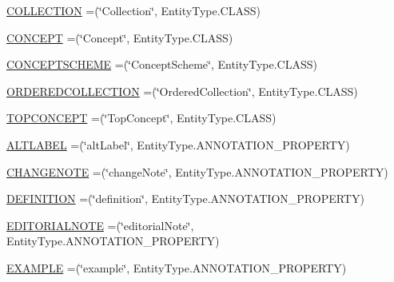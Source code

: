 \begin{DoxyCompactItemize}
\hyperlink{enumorg_1_1semanticweb_1_1owlapi_1_1vocab_1_1_s_k_o_s_vocabulary_abfe5058a98d1c09f7388a36462be1392}{C\-O\-L\-L\-E\-C\-T\-I\-O\-N} =(\char`\"{}Collection\char`\"{}, Entity\-Type.\-C\-L\-A\-S\-S)
\item 
\hyperlink{enumorg_1_1semanticweb_1_1owlapi_1_1vocab_1_1_s_k_o_s_vocabulary_af8de0e17e0cee3a3f769f9d3699b5f27}{C\-O\-N\-C\-E\-P\-T} =(\char`\"{}Concept\char`\"{}, Entity\-Type.\-C\-L\-A\-S\-S)
\item 
\hyperlink{enumorg_1_1semanticweb_1_1owlapi_1_1vocab_1_1_s_k_o_s_vocabulary_aff3ae474a4855b319152fc7c3813a4b4}{C\-O\-N\-C\-E\-P\-T\-S\-C\-H\-E\-M\-E} =(\char`\"{}Concept\-Scheme\char`\"{}, Entity\-Type.\-C\-L\-A\-S\-S)
\item 
\hyperlink{enumorg_1_1semanticweb_1_1owlapi_1_1vocab_1_1_s_k_o_s_vocabulary_aed09239d86300bd7a8c62e9791048c8b}{O\-R\-D\-E\-R\-E\-D\-C\-O\-L\-L\-E\-C\-T\-I\-O\-N} =(\char`\"{}Ordered\-Collection\char`\"{}, Entity\-Type.\-C\-L\-A\-S\-S)
\item 
\hyperlink{enumorg_1_1semanticweb_1_1owlapi_1_1vocab_1_1_s_k_o_s_vocabulary_a86788482a8dc25c754d5b41f17113b71}{T\-O\-P\-C\-O\-N\-C\-E\-P\-T} =(\char`\"{}Top\-Concept\char`\"{}, Entity\-Type.\-C\-L\-A\-S\-S)
\item 
\hyperlink{enumorg_1_1semanticweb_1_1owlapi_1_1vocab_1_1_s_k_o_s_vocabulary_a4b9e80e618910c51b3f5633ce8e1fc8b}{A\-L\-T\-L\-A\-B\-E\-L} =(\char`\"{}alt\-Label\char`\"{}, Entity\-Type.\-A\-N\-N\-O\-T\-A\-T\-I\-O\-N\-\_\-\-P\-R\-O\-P\-E\-R\-T\-Y)
\item 
\hyperlink{enumorg_1_1semanticweb_1_1owlapi_1_1vocab_1_1_s_k_o_s_vocabulary_a554cca7448b38205c243ba8e6a42aef9}{C\-H\-A\-N\-G\-E\-N\-O\-T\-E} =(\char`\"{}change\-Note\char`\"{}, Entity\-Type.\-A\-N\-N\-O\-T\-A\-T\-I\-O\-N\-\_\-\-P\-R\-O\-P\-E\-R\-T\-Y)
\item 
\hyperlink{enumorg_1_1semanticweb_1_1owlapi_1_1vocab_1_1_s_k_o_s_vocabulary_aecf30fba6a050cd6670c364b16d7bd10}{D\-E\-F\-I\-N\-I\-T\-I\-O\-N} =(\char`\"{}definition\char`\"{}, Entity\-Type.\-A\-N\-N\-O\-T\-A\-T\-I\-O\-N\-\_\-\-P\-R\-O\-P\-E\-R\-T\-Y)
\item 
\hyperlink{enumorg_1_1semanticweb_1_1owlapi_1_1vocab_1_1_s_k_o_s_vocabulary_afc079b28aa558fcca018e52acdbf1d41}{E\-D\-I\-T\-O\-R\-I\-A\-L\-N\-O\-T\-E} =(\char`\"{}editorial\-Note\char`\"{}, Entity\-Type.\-A\-N\-N\-O\-T\-A\-T\-I\-O\-N\-\_\-\-P\-R\-O\-P\-E\-R\-T\-Y)
\item 
\hyperlink{enumorg_1_1semanticweb_1_1owlapi_1_1vocab_1_1_s_k_o_s_vocabulary_a1b343a704e1e2d884cecd4439a743be9}{E\-X\-A\-M\-P\-L\-E} =(\char`\"{}example\char`\"{}, Entity\-Type.\-A\-N\-N\-O\-T\-A\-T\-I\-O\-N\-\_\-\-P\-R\-O\-P\-E\-R\-T\-Y)

\end{DoxyCompactItemize}
